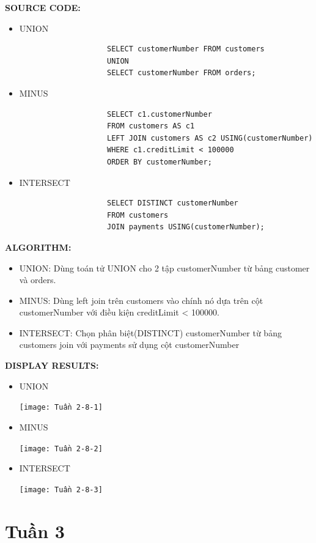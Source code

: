 \documentclass[12pt,a4paper]{report}
\begin{document}
	{\bf SOURCE CODE:}
		\begin{itemize}
			\item UNION
				\begin{lstlisting}
					SELECT customerNumber FROM customers
					UNION
					SELECT customerNumber FROM orders;
				\end{lstlisting}
			\item MINUS
				\begin{lstlisting}
					SELECT c1.customerNumber
					FROM customers AS c1
					LEFT JOIN customers AS c2 USING(customerNumber)
					WHERE c1.creditLimit < 100000
					ORDER BY customerNumber;
				\end{lstlisting}
			\item INTERSECT
				\begin{lstlisting}
					SELECT DISTINCT customerNumber
					FROM customers
					JOIN payments USING(customerNumber);
				\end{lstlisting}
		\end{itemize}
		
	{\bf ALGORITHM:}
		\begin{itemize}
			\item UNION: Dùng toán tử UNION cho 2 tập customerNumber từ bảng customer và orders.
			\item MINUS: Dùng left join trên customers vào chính nó dựa trên cột customerNumber với điều kiện creditLimit < 100000.
			\item INTERSECT: Chọn phân biệt(DISTINCT) customerNumber từ bảng customers join với payments sử dụng cột customerNumber
		\end{itemize}
	
	{\bf DISPLAY RESULTS:}
		\begin{itemize}
			\item UNION
				\begin{center}
					\texttt{[image: Tuần 2-8-1]}
				\end{center}
			\item MINUS
				\begin{center}
					\texttt{[image: Tuần 2-8-2]}
				\end{center}
			\item INTERSECT
				\begin{center}
					\texttt{[image: Tuần 2-8-3]}
				\end{center}
		\end{itemize}
\newpage
\section{Tuần 3}
\end{document}
